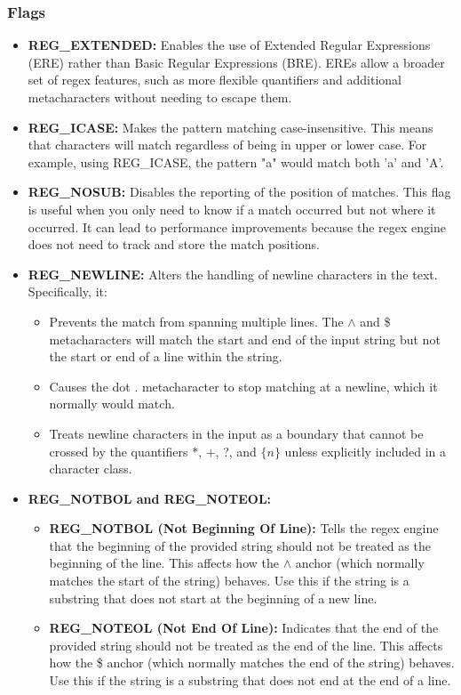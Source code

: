 \documentclass{report}
\begin{document}
    \subsubsection{Flags}
    \begin{itemize}
        \item \textbf{REG\_EXTENDED:} Enables the use of Extended Regular Expressions (ERE) rather than Basic Regular Expressions (BRE). EREs allow a broader set of regex features, such as more flexible quantifiers and additional metacharacters without needing to escape them.
        \item \textbf{REG\_ICASE:} Makes the pattern matching case-insensitive. This means that characters will match regardless of being in upper or lower case. For example, using REG\_ICASE, the pattern "a" would match both 'a' and 'A'.
        \item \textbf{REG\_NOSUB:} Disables the reporting of the position of matches. This flag is useful when you only need to know if a match occurred but not where it occurred. It can lead to performance improvements because the regex engine does not need to track and store the match positions.
        \item \textbf{REG\_NEWLINE:} Alters the handling of newline characters in the text. Specifically, it:
            \begin{itemize}
                \item Prevents the match from spanning multiple lines. The $\land$ and \$ metacharacters will match the start and end of the input string but not the start or end of a line within the string.
                \item Causes the dot . metacharacter to stop matching at a newline, which it normally would match.
                \item Treats newline characters in the input as a boundary that cannot be crossed by the quantifiers $*$, $+$, ?, and $\{n\}$ unless explicitly included in a character class.
            \end{itemize}
        \item \textbf{REG\_NOTBOL and REG\_NOTEOL:}
            \begin{itemize}
                \item \textbf{REG\_NOTBOL (Not Beginning Of Line):} Tells the regex engine that the beginning of the provided string should not be treated as the beginning of the line. This affects how the $\land$ anchor (which normally matches the start of the string) behaves. Use this if the string is a substring that does not start at the beginning of a new line.
                \item \textbf{REG\_NOTEOL (Not End Of Line):} Indicates that the end of the provided string should not be treated as the end of the line. This affects how the \$ anchor (which normally matches the end of the string) behaves. Use this if the string is a substring that does not end at the end of a line.
            \end{itemize}
    \end{itemize}
\end{document}
